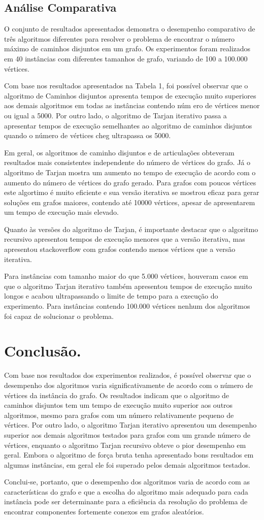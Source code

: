 \subsection{\esp Análise Comparativa}

O conjunto de resultados apresentados demonstra o desempenho comparativo de três algoritmos diferentes para resolver o problema de encontrar o número máximo de caminhos disjuntos em um grafo. Os experimentos foram realizados em 40 instâncias com diferentes tamanhos de grafo, variando de 100 a 100.000 vértices.

Com base nos resultados apresentados na Tabela 1, foi possível observar que o algoritmo de Caminhos disjuntos apresenta tempos de execução muito superiores aos demais algoritmos em todas as instâncias contendo núm ero de vértices menor ou igual a 5000. Por outro lado, o algoritmo de Tarjan iterativo passa a apresentar tempos de execução semelhantes ao algoritmo de caminhos disjuntos quando o número de vértices cheg ultrapassa os 5000.

Em geral, os algoritmos de caminho disjuntos e de articulações obteveram resultados mais consistentes independente do número de vértices do grafo. Já o algoritmo de Tarjan mostra um aumento no tempo de execução de acordo com o aumento do número de vértices do grafo gerado. Para grafos com poucos vértices este algortimo é muito eficiente e sua versão iterativa se mostrou eficaz para gerar soluções em grafos maiores, contendo até 10000 vértices, apesar de apresentarem um tempo de execução mais elevado. 

Quanto às versões do algoritmo de Tarjan, é importante destacar que o algoritmo recursivo apresentou tempos de execução menores que a versão iterativa, mas apresentou stackoverflow com grafos contendo menos vértices que a versão iterativa.  

Para instâncias com tamanho maior do que 5.000 vértices, houveram casos em que o algoritmo Tarjan iterativo também apresentou tempos de execução muito longos e acabou ultrapassando o limite de tempo para a execução do experimento. Para instâncias contendo 100.000 vértices nenhum dos algoritmos foi capaz de solucionar o problema. 


\section{\esp Conclusão.}

Com base nos resultados dos experimentos realizados, é possível observar que o desempenho dos algoritmos varia significativamente de acordo com o número de vértices da instância do grafo. Os resultados indicam que o algoritmo de caminhos disjuntos tem um tempo de execução muito superior aos outros algoritmos, mesmo para grafos com um número relativamente pequeno de vértices. Por outro lado, o algoritmo Tarjan iterativo apresentou um desempenho superior aos demais algoritmos testados para grafos com um grande número de vértices, enquanto o algoritmo Tarjan recursivo obteve o pior desempenho em geral. Embora o algoritmo de força bruta tenha apresentado bons resultados em algumas instâncias, em geral ele foi superado pelos demais algoritmos testados.

Conclui-se, portanto, que o desempenho dos algoritmos varia de acordo com as características do grafo e que a escolha do algoritmo mais adequado para cada instância pode ser determinante para a eficiência da resolução do problema de encontrar componentes fortemente conexos em grafos aleatórios.
